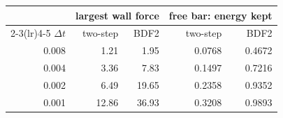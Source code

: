 \begin{tabular}{rrrrr}
\toprule
 & \multicolumn{2}{c}{largest wall force} & \multicolumn{2}{c}{free bar: energy kept} \\
\cmidrule(lr){2-3}\cmidrule(lr){4-5}
$\Delta t$ & two-step & BDF2 & two-step & BDF2 \\
\midrule
0.008 & 1.21 & 1.95 & 0.0768 & 0.4672 \\
0.004 & 3.36 & 7.83 & 0.1497 & 0.7216 \\
0.002 & 6.49 & 19.65 & 0.2358 & 0.9352 \\
0.001 & 12.86 & 36.93 & 0.3208 & 0.9893 \\
\bottomrule
\end{tabular}
